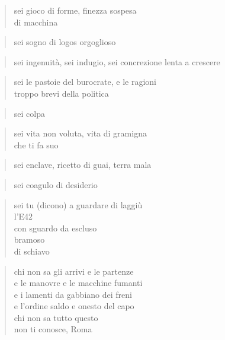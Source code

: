 \begin{verse}
    sei gioco di forme, finezza sospesa\\
    di macchina
\end{verse}

\begin{verse}
    sei sogno di logos orgoglioso
\end{verse}

\begin{verse}
    sei ingenuità, sei indugio, sei concrezione
    lenta a crescere
\end{verse}

\begin{verse}
    sei le pastoie del burocrate, e le ragioni\\
    troppo brevi della politica
\end{verse}

\begin{verse}
    sei colpa
\end{verse}

\begin{verse}
    sei vita non voluta, vita di gramigna\\
    che ti fa suo
\end{verse}

\begin{verse}
    sei enclave, ricetto di guai, terra mala
\end{verse}

\begin{verse}
    sei coagulo di desiderio
\end{verse}

\begin{verse}
    sei tu (dicono) a guardare di laggiù\\
    l'E42\\
    con sguardo da escluso\\
    bramoso\\
    di schiavo
\end{verse}

\clearpage


\begin{verse}
    chi non sa gli arrivi e le partenze\\
    e le manovre e le macchine fumanti\\
    e i lamenti da gabbiano dei freni\\
    e l'ordine saldo e onesto del capo\\
    chi non sa tutto questo\\
    non ti conosce, Roma
\end{verse}

